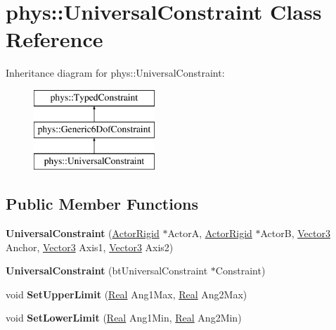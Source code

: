 \hypertarget{classphys_1_1UniversalConstraint}{
\section{phys::UniversalConstraint Class Reference}
\label{d0/d09/classphys_1_1UniversalConstraint}
}
Inheritance diagram for phys::UniversalConstraint:\begin{figure}[H]
\begin{center}
\leavevmode
\includegraphics[height=3cm]{d0/d09/classphys_1_1UniversalConstraint}
\end{center}
\end{figure}
\subsection*{Public Member Functions}
\begin{DoxyCompactItemize}
\item 
\hypertarget{classphys_1_1UniversalConstraint_af08d5335171393e338b0617f99855701}{
{\bfseries UniversalConstraint} (\hyperlink{classphys_1_1ActorRigid}{ActorRigid} $\ast$ActorA, \hyperlink{classphys_1_1ActorRigid}{ActorRigid} $\ast$ActorB, \hyperlink{classphys_1_1Vector3}{Vector3} Anchor, \hyperlink{classphys_1_1Vector3}{Vector3} Axis1, \hyperlink{classphys_1_1Vector3}{Vector3} Axis2)}
\label{d0/d09/classphys_1_1UniversalConstraint_af08d5335171393e338b0617f99855701}

\item 
\hypertarget{classphys_1_1UniversalConstraint_af4d0828590b7fb242f601a171aa5db5f}{
{\bfseries UniversalConstraint} (btUniversalConstraint $\ast$Constraint)}
\label{d0/d09/classphys_1_1UniversalConstraint_af4d0828590b7fb242f601a171aa5db5f}

\item 
\hypertarget{classphys_1_1UniversalConstraint_a91e521aef75d4d32f91868ba31f486da}{
void {\bfseries SetUpperLimit} (\hyperlink{namespacephys_af7eb897198d265b8e868f45240230d5f}{Real} Ang1Max, \hyperlink{namespacephys_af7eb897198d265b8e868f45240230d5f}{Real} Ang2Max)}
\label{d0/d09/classphys_1_1UniversalConstraint_a91e521aef75d4d32f91868ba31f486da}

\item 
\hypertarget{classphys_1_1UniversalConstraint_a09b51abf3370f7834c9c1c2a326c57ca}{
void {\bfseries SetLowerLimit} (\hyperlink{namespacephys_af7eb897198d265b8e868f45240230d5f}{Real} Ang1Min, \hyperlink{namespacephys_af7eb897198d265b8e868f45240230d5f}{Real} Ang2Min)}
\label{d0/d09/classphys_1_1UniversalConstraint_a09b51abf3370f7834c9c1c2a326c57ca}

\end{DoxyCompactItemize}
